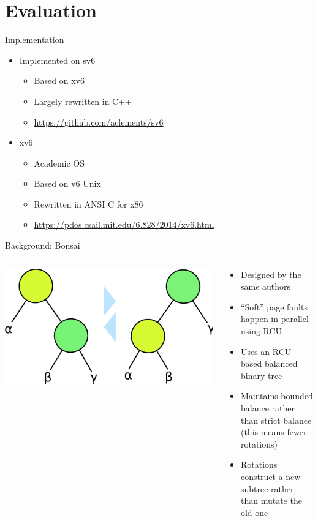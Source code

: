 \documentclass[aspectratio=169]{beamer}
\newcommand{\bi}{\begin{itemize}}
\newcommand{\ei}{\end{itemize}}
\begin{document}
\section{Evaluation}

\begin{frame}{Implementation}
  \begin{center}
    \bi
  \item Implemented on sv6
    \bi
  \item Based on xv6
  \item Largely rewritten in C++
  \item \url{https://github.com/aclements/sv6}
    \ei
    \vspace{1em}
  \item xv6
    \bi
  \item Academic OS
  \item Based on v6 Unix
  \item Rewritten in ANSI C for x86
  \item \url{https://pdos.csail.mit.edu/6.828/2014/xv6.html}
    \ei
    \ei
  \end{center}
\end{frame}

\begin{frame}{Background: Bonsai}
  \begin{columns}[T]
    \begin{column}{0.6\textwidth}
      \begin{center}
        \includegraphics[scale=0.2]{./figures/Binary_tree_rotation.png}
      \end{center}
    \end{column}
    \begin{column}{0.4\textwidth}
      \bi
    \item Designed by the same authors
    \item ``Soft'' page faults happen in parallel using RCU
    \item Uses an RCU-based balanced binary tree
    \item Maintains bounded balance rather than strict balance\\
      (this means fewer rotations)
    \item Rotations construct a new subtree rather than mutate the old one
      \ei
    \end{column}
  \end{columns}
\end{frame}
\end{document}
